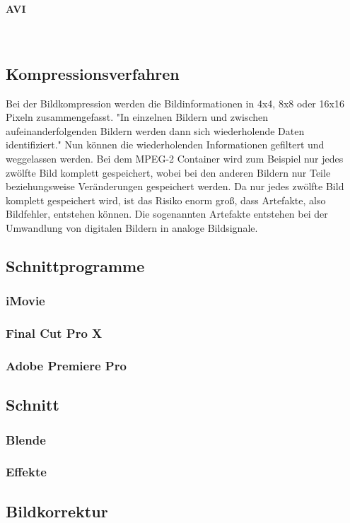 \paragraph{AVI}
\leavevmode \\
\subsection{Kompressionsverfahren}
Bei der Bildkompression werden die Bildinformationen in 4x4, 8x8 oder 16x16 Pixeln zusammengefasst. "In einzelnen Bildern und zwischen aufeinanderfolgenden Bildern werden dann sich wiederholende Daten identifiziert." Nun können die wiederholenden Informationen gefiltert und weggelassen werden. Bei dem MPEG-2 Container wird zum Beispiel nur jedes zwölfte Bild komplett gespeichert, wobei bei den anderen Bildern nur Teile beziehungsweise Veränderungen gespeichert werden. Da nur jedes zwölfte Bild komplett gespeichert wird, ist das Risiko enorm groß, dass Artefakte, also Bildfehler, entstehen können. Die sogenannten Artefakte entstehen bei der Umwandlung von digitalen Bildern in analoge Bildsignale. 
\subsection{Schnittprogramme}
\subsubsection{iMovie}
\subsubsection{Final Cut Pro X}
\subsubsection{Adobe Premiere Pro}
\subsection{Schnitt}
\subsubsection{Blende}
\subsubsection{Effekte}
\subsection{Bildkorrektur}
